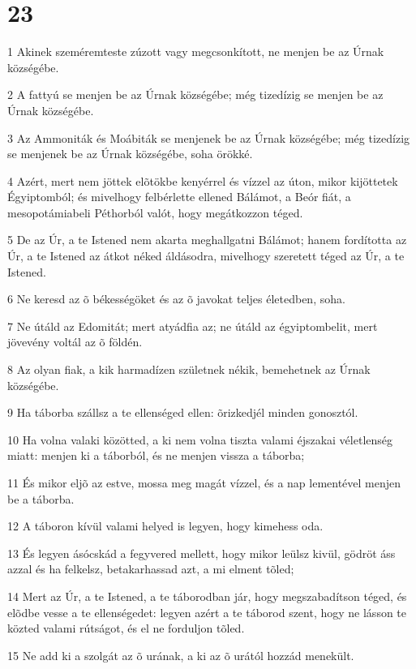 \chapter{23}

\par 1 Akinek szeméremteste zúzott vagy megcsonkított, ne menjen be az Úrnak községébe.
\par 2 A fattyú se menjen be az Úrnak községébe; még tizedízig se menjen be az Úrnak községébe.
\par 3 Az Ammoniták és Moábiták se menjenek be az Úrnak községébe; még tizedízig se menjenek be az Úrnak községébe, soha örökké.
\par 4 Azért, mert nem jöttek elõtökbe kenyérrel és vízzel az úton, mikor kijöttetek Égyiptomból; és mivelhogy felbérlette ellened Bálámot, a Beór fiát, a mesopotámiabeli Péthorból valót, hogy megátkozzon téged.
\par 5 De az Úr, a te Istened nem akarta meghallgatni Bálámot; hanem fordította az Úr, a te Istened az átkot néked áldásodra, mivelhogy szeretett téged az Úr, a te Istened.
\par 6 Ne keresd az õ békességöket és az õ javokat teljes életedben, soha.
\par 7 Ne útáld az Edomitát; mert atyádfia az; ne útáld az égyiptombelit, mert jövevény voltál az õ földén.
\par 8 Az olyan fiak, a kik harmadízen születnek nékik, bemehetnek az Úrnak községébe.
\par 9 Ha táborba szállsz a te ellenséged ellen: õrizkedjél minden gonosztól.
\par 10 Ha volna valaki közötted, a ki nem volna tiszta valami éjszakai véletlenség miatt: menjen ki a táborból, és ne menjen vissza a táborba;
\par 11 És mikor eljõ az estve, mossa meg magát vízzel, és a nap lementével menjen be a táborba.
\par 12 A táboron kívül valami helyed is legyen, hogy kimehess oda.
\par 13 És legyen ásócskád a fegyvered mellett, hogy mikor leülsz kivül, gödröt áss azzal és ha felkelsz, betakarhassad azt, a mi elment tõled;
\par 14 Mert az Úr, a te Istened, a te táborodban jár, hogy megszabadítson téged, és elõdbe vesse a te ellenségedet: legyen azért a te táborod szent, hogy ne lásson te közted valami rútságot, és el ne forduljon tõled.
\par 15 Ne add ki a szolgát az õ urának, a ki az õ urától hozzád menekült.
